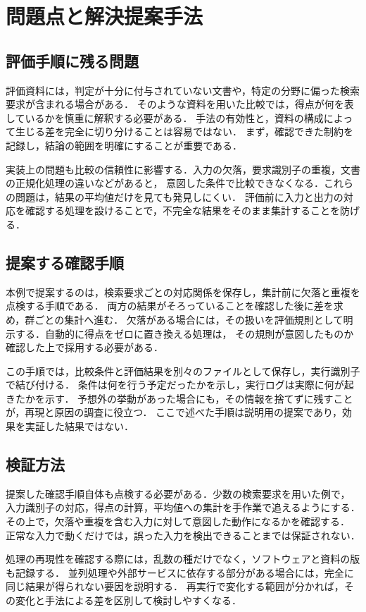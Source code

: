 \chapter{問題点と解決提案手法}
\label{sec:approach}

\section{評価手順に残る問題}
評価資料には，判定が十分に付与されていない文書や，特定の分野に偏った検索要求が含まれる場合がある．
そのような資料を用いた比較では，得点が何を表しているかを慎重に解釈する必要がある．
手法の有効性と，資料の構成によって生じる差を完全に切り分けることは容易ではない．
まず，確認できた制約を記録し，結論の範囲を明確にすることが重要である．

実装上の問題も比較の信頼性に影響する．入力の欠落，要求識別子の重複，文書の正規化処理の違いなどがあると，
意図した条件で比較できなくなる．これらの問題は，結果の平均値だけを見ても発見しにくい．
評価前に入力と出力の対応を確認する処理を設けることで，不完全な結果をそのまま集計することを防げる．

\section{提案する確認手順}
本例で提案するのは，検索要求ごとの対応関係を保存し，集計前に欠落と重複を点検する手順である．
両方の結果がそろっていることを確認した後に差を求め，群ごとの集計へ進む．
欠落がある場合には，その扱いを評価規則として明示する．自動的に得点をゼロに置き換える処理は，
その規則が意図したものか確認した上で採用する必要がある．

この手順では，比較条件と評価結果を別々のファイルとして保存し，実行識別子で結び付ける．
条件は何を行う予定だったかを示し，実行ログは実際に何が起きたかを示す．
予想外の挙動があった場合にも，その情報を捨てずに残すことが，再現と原因の調査に役立つ．
ここで述べた手順は説明用の提案であり，効果を実証した結果ではない．

\newpage
\section{検証方法}
提案した確認手順自体も点検する必要がある．少数の検索要求を用いた例で，
入力識別子の対応，得点の計算，平均値への集計を手作業で追えるようにする．
その上で，欠落や重複を含む入力に対して意図した動作になるかを確認する．
正常な入力で動くだけでは，誤った入力を検出できることまでは保証されない．

処理の再現性を確認する際には，乱数の種だけでなく，ソフトウェアと資料の版も記録する．
並列処理や外部サービスに依存する部分がある場合には，完全に同じ結果が得られない要因を説明する．
再実行で変化する範囲が分かれば，その変化と手法による差を区別して検討しやすくなる．

